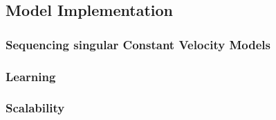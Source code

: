 \subsection{Model Implementation}
\label{sec:Method:ModelImplementation}



\subsubsection{Sequencing singular Constant Velocity Models}
\label{sec:Method:ModelImplementation:}



\subsubsection{Learning}
\label{sec:Method:ModelImplementation:Learning}



\subsubsection{Scalability}
\label{sec:Method:ModelImplementation:Scalability}
